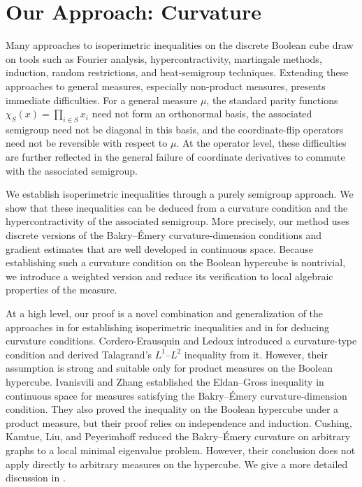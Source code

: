 \section{Our Approach: Curvature}

Many approaches to isoperimetric inequalities on the discrete Boolean cube draw on tools such as Fourier analysis, hypercontractivity, martingale methods, induction, random restrictions, and heat-semigroup techniques. Extending these approaches to general measures, especially non-product measures, presents immediate difficulties. For a general measure \(\mu\), the standard parity functions \(\chi_S(x)=\prod_{i\in S}x_i\) need not form an orthonormal basis, the associated semigroup need not be diagonal in this basis, and the coordinate-flip operators need not be reversible with respect to \(\mu\). At the operator level, these difficulties are further reflected in the general failure of coordinate derivatives to commute with the associated semigroup.


We establish isoperimetric inequalities through a purely semigroup approach.
We show that these inequalities can be deduced from a curvature condition and the hypercontractivity of the associated semigroup. More precisely, our method uses discrete versions of the Bakry--\'Emery curvature-dimension conditions and gradient estimates that are well developed in continuous space. Because establishing such a curvature condition on the Boolean hypercube is nontrivial, we introduce a weighted version and reduce its verification to local algebraic properties of the measure.

At a high level, our proof is a novel combination and generalization of the approaches in \cite{CorderoErausquinLedoux12,IvanisviliZhang26} for establishing isoperimetric inequalities and in \cite{CKLP22} for deducing curvature conditions. 
Cordero-Erausquin and Ledoux \cite{CorderoErausquinLedoux12} introduced a curvature-type condition and derived Talagrand's $L^1$--$L^2$ inequality from it. However, their assumption is strong and suitable only for product measures on the Boolean hypercube. 
Ivanisvili and Zhang \cite{IvanisviliZhang26} established the Eldan--Gross inequality in continuous space for measures satisfying the Bakry--\'Emery curvature-dimension condition. They also proved the inequality on the Boolean hypercube under a product measure, but their proof relies on independence and induction.
Cushing, Kamtue, Liu, and Peyerimhoff reduced the Bakry--\'Emery curvature on arbitrary graphs to a local minimal eigenvalue problem. However, their conclusion does not apply directly to arbitrary measures on the hypercube.
We give a more detailed discussion in .


